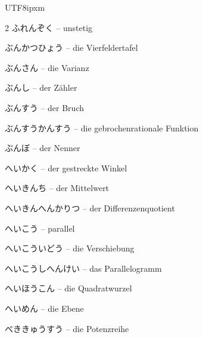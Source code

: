 \begin{CJK}{UTF8}{ipxm}
\begin{multicols}{2}
 {\footnotesize\color{black!70}ふれんぞく} -- unstetig\dotfill\hyperref[e:269]{\pageref*{e:269}}\par
{} {\footnotesize\color{black!70}ぶんかつひょう} -- die Vierfeldertafel\dotfill\hyperref[e:333]{\pageref*{e:333}}\par
{} {\footnotesize\color{black!70}ぶんさん} -- die Varianz\dotfill\hyperref[e:336]{\pageref*{e:336}}\par
{} {\footnotesize\color{black!70}ぶんし} -- der Zähler\dotfill\hyperref[e:29]{\pageref*{e:29}}\par
{} {\footnotesize\color{black!70}ぶんすう} -- der Bruch\dotfill\hyperref[e:28]{\pageref*{e:28}}\par
{} {\footnotesize\color{black!70}ぶんすうかんすう} -- die gebrochenrationale Funktion\dotfill\hyperref[e:127]{\pageref*{e:127}}\par
{} {\footnotesize\color{black!70}ぶんぼ} -- der Nenner\dotfill\hyperref[e:30]{\pageref*{e:30}}\par
{} {\footnotesize\color{black!70}へいかく} -- der gestreckte Winkel\dotfill\hyperref[e:160]{\pageref*{e:160}}\par
{} {\footnotesize\color{black!70}へいきんち} -- der Mittelwert\dotfill\hyperref[e:338]{\pageref*{e:338}}\par
{} {\footnotesize\color{black!70}へいきんへんかりつ} -- der Differenzenquotient\dotfill\hyperref[e:272]{\pageref*{e:272}}\par
{} {\footnotesize\color{black!70}へいこう} -- parallel\dotfill\hyperref[e:150]{\pageref*{e:150}}\par
{} {\footnotesize\color{black!70}へいこういどう} -- die Verschiebung\dotfill\hyperref[e:173]{\pageref*{e:173}}\par
{} {\footnotesize\color{black!70}へいこうしへんけい} -- das Parallelogramm\dotfill\hyperref[e:200]{\pageref*{e:200}}\par
{} {\footnotesize\color{black!70}へいほうこん} -- die Quadratwurzel\dotfill\hyperref[e:45]{\pageref*{e:45}}\par
{} {\footnotesize\color{black!70}へいめん} -- die Ebene\dotfill\hyperref[e:308]{\pageref*{e:308}}\par
{} {\footnotesize\color{black!70}べききゅうすう} -- die Potenzreihe\dotfill\hyperref[e:267]{\pageref*{e:267}}\par

\end{multicols}
\end{CJK}
